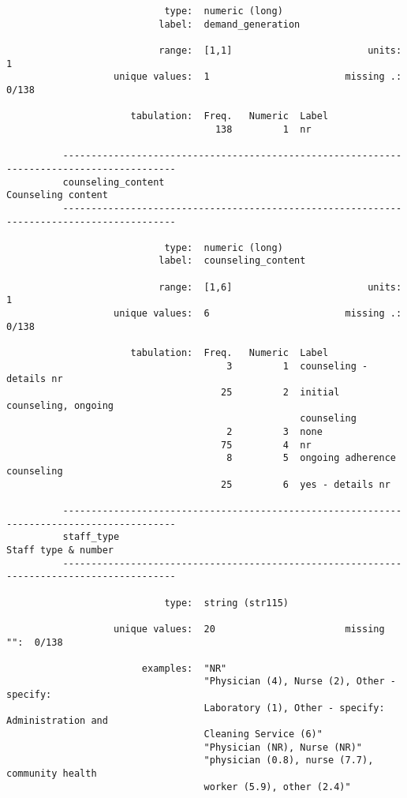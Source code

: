 \documentclass{article}
\begin{document}
\begin{verbatim}
                            type:  numeric (long)
                           label:  demand_generation
          
                           range:  [1,1]                        units:  1
                   unique values:  1                        missing .:  0/138
          
                      tabulation:  Freq.   Numeric  Label
                                     138         1  nr
          
          ------------------------------------------------------------------------------------------
          counseling_content                                                      Counseling content
          ------------------------------------------------------------------------------------------
          
                            type:  numeric (long)
                           label:  counseling_content
          
                           range:  [1,6]                        units:  1
                   unique values:  6                        missing .:  0/138
          
                      tabulation:  Freq.   Numeric  Label
                                       3         1  counseling - details nr
                                      25         2  initial counseling, ongoing
                                                    counseling
                                       2         3  none
                                      75         4  nr
                                       8         5  ongoing adherence counseling
                                      25         6  yes - details nr
          
          ------------------------------------------------------------------------------------------
          staff_type                                                             Staff type & number
          ------------------------------------------------------------------------------------------
          
                            type:  string (str115)
          
                   unique values:  20                       missing "":  0/138
          
                        examples:  "NR"
                                   "Physician (4), Nurse (2), Other - specify:
                                   Laboratory (1), Other - specify: Administration and
                                   Cleaning Service (6)"
                                   "Physician (NR), Nurse (NR)"
                                   "physician (0.8), nurse (7.7), community health
                                   worker (5.9), other (2.4)"
          

\end{verbatim}
\end{document}

